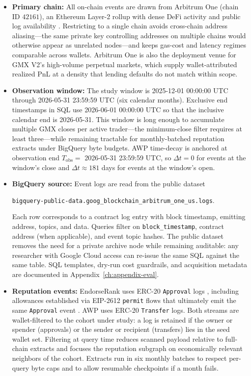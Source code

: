 \begin{itemize}
\item \textbf{Primary chain:} All on-chain events are drawn from Arbitrum One (chain ID $42161$), an Ethereum Layer-2 rollup with dense DeFi activity and public log availability . Restricting to a single chain avoids cross-chain address aliasing---the same private key controlling addresses on multiple chains would otherwise appear as unrelated nodes---and keeps gas-cost and latency regimes comparable across wallets. Arbitrum One is also the deployment venue for GMX V2's high-volume perpetual markets, which supply wallet-attributed realized PnL at a density that lending defaults do not match within scope.

\item \textbf{Observation window:} The study window is 2025-12-01 00:00:00 UTC through 2026-05-31 23:59:59 UTC (six calendar months). Exclusive end timestamps in SQL use 2026-06-01 00:00:00 UTC so that the inclusive calendar end is 2026-05-31. This window is long enough to accumulate multiple GMX closes per active trader---the minimum-close filter requires at least three---while remaining tractable for monthly-batched reputation extracts under BigQuery byte budgets. AWP time-decay is anchored at observation end $T_{\mathrm{obs}}=$ 2026-05-31 23:59:59 UTC, so $\Delta t=0$ for events at the window's close and $\Delta t\approx 181$ days for events at the window's open.

\item \textbf{BigQuery source:} Event logs are read from the public dataset
\begin{center}
\texttt{bigquery-public-data.goog\_blockchain\_arbitrum\_one\_us.logs}.
\end{center}
Each row corresponds to a contract log entry with block timestamp, emitting address, topics, and data. Queries filter on \texttt{block\_timestamp}, contract address (when applicable), and event topic hashes. The public dataset removes the need for a private archive node while remaining auditable: any researcher with Google Cloud access can re-issue the same SQL against the same table. SQL templates, dry-run cost guardrails, and acquisition metadata are documented in Appendix~\ref{ch:appendix-eval}.

\item \textbf{Reputation events:} EndorseRank uses ERC-20 \texttt{Approval} logs , including allowances established via EIP-2612 \texttt{permit} flows that ultimately emit the same \texttt{Approval} event . AWP uses ERC-20 \texttt{Transfer} logs. Both streams are wallet-filtered to the cohort under study: a log is retained if the owner or spender (approvals) or the sender or recipient (transfers) lies in the seed wallet set. Filtering at query time reduces scanned payload relative to full-chain extracts and focuses the reputation subgraph on economically relevant neighbors of the cohort. Extracts run in six monthly batches to respect per-query byte caps and to allow resumable checkpoints if a month fails.


\end{itemize}
